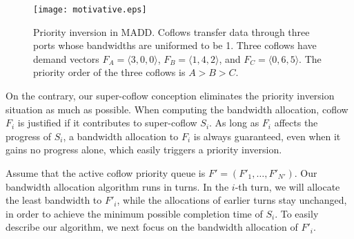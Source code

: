 \documentclass[10pt, conference, letterpaper]{IEEEtran}
\begin{document}
\begin{figure}[!t]
	\centering\texttt{[image: motivative.eps]}
	\caption{Priority inversion in MADD. Coflows transfer data through three ports whose bandwidths are uniformed to be 1. Three coflows have demand vectors $F_A=\langle 3,0,0\rangle$, $F_B=\langle 1,4,2\rangle$, and $F_C=\langle 0,6,5\rangle$. The priority order of the three coflows is $A > B > C$.}\label{motivative}
\end{figure}


On the contrary, our super-coflow conception eliminates the priority inversion situation as much as possible. When computing the bandwidth allocation, coflow $F_i$ is justified if it contributes to super-coflow $S_i$. As long as $F_i$ affects the progress of $S_i$, a bandwidth allocation to $F_i$ is always guaranteed, even when it gains no progress alone, which easily triggers a priority inversion.

Assume that the active coflow priority queue is $F'=(F'_1,\dots,F'_{N'})$. Our bandwidth allocation algorithm runs in turns. In the $i$-th turn, we will allocate the least bandwidth to $F'_i$, while the allocations of earlier turns stay unchanged,  in order to achieve the minimum possible completion time of $S_i$. To easily describe our algorithm, we next focus on the bandwidth allocation of $F'_i$.
\end{document}
